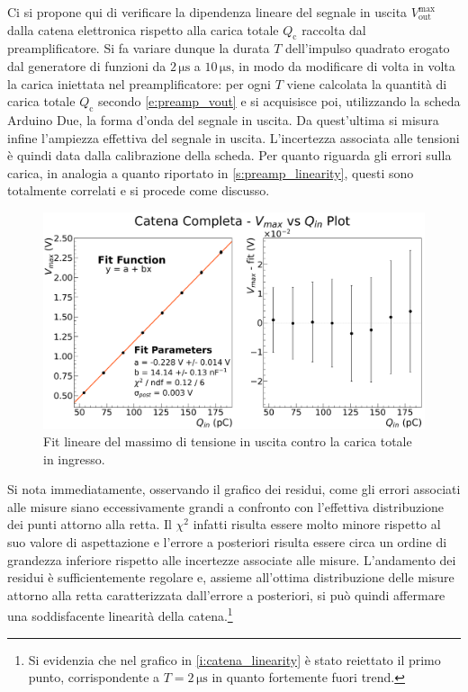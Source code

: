 \documentclass[a4paper,11pt]{article} %
\begin{document}
Ci si propone qui di verificare la dipendenza lineare del segnale in uscita $V_{\text{out}}^{\text{max}}$ dalla catena
elettronica rispetto alla carica totale $Q_{\text{c}}$ raccolta dal preamplificatore. Si fa variare dunque la durata $T$
dell'impulso quadrato erogato dal generatore di funzioni da $2\,\si{\us}$ a $10\,\si{\us}$, in modo da modificare di
volta in volta la carica iniettata nel preamplificatore: per ogni $T$ viene calcolata la quantità di carica totale
$Q_{\text{c}}$ secondo \autoref{e:preamp_vout} e si acquisisce poi, utilizzando la scheda Arduino Due, la forma d'onda
del segnale in uscita. Da quest'ultima si misura infine l'ampiezza effettiva del segnale in uscita. L'incertezza
associata alle tensioni è quindi data dalla calibrazione della scheda. Per quanto riguarda gli errori sulla carica, in
analogia a quanto riportato in \autoref{s:preamp_linearity}, questi sono totalmente correlati e si procede come
discusso.
\begin{figure}[H]
	\centering
	\includegraphics[width=0.9\linewidth]{../Plots/Catena/catena_linearity.png}
	\caption{\small Fit lineare del massimo di tensione in uscita contro la carica totale in ingresso.}
	\label{i:catena_linearity}
\end{figure}
\noindent Si nota immediatamente, osservando il grafico dei residui, come gli errori associati alle misure siano
eccessivamente grandi a confronto con l'effettiva distribuzione dei punti attorno alla retta. Il $\chi^2$ infatti
risulta essere molto minore rispetto al suo valore di aspettazione e l'errore a posteriori risulta essere circa un
ordine di grandezza inferiore rispetto alle incertezze associate alle misure. L'andamento dei residui è sufficientemente
regolare e, assieme all'ottima distribuzione delle misure attorno alla retta caratterizzata dall'errore a posteriori, si
può quindi affermare una soddisfacente linearità della catena.\footnote{Si evidenzia che nel grafico in
\autoref{i:catena_linearity} è stato reiettato il primo punto, corrispondente a $T=2\,\si{\us}$ in quanto fortemente
fuori trend.}










\end{document}
